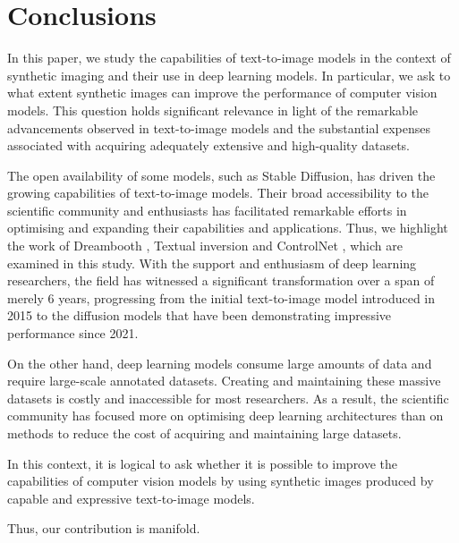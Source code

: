 \chapter{Conclusions} \label{sec:conclusions}

In this paper, we study the capabilities of text-to-image models in the context of synthetic imaging and their use in deep learning models. In particular, we ask to what extent synthetic images can improve the performance of computer vision models. This question holds significant relevance in light of the remarkable advancements observed in text-to-image models and the substantial expenses associated with acquiring adequately extensive and high-quality datasets.

The open availability of some models, such as Stable Diffusion, has driven the growing capabilities of text-to-image models. Their broad accessibility to the scientific community and enthusiasts has facilitated remarkable efforts in optimising and expanding their capabilities and applications. Thus, we highlight the work of Dreambooth \cite{ruiz2023dreambooth}, Textual inversion \cite{gal2022image} and ControlNet \cite{zhang2023adding}, which are examined in this study. With the support and enthusiasm of deep learning researchers, the field has witnessed a significant transformation over a span of merely 6 years, progressing from the initial text-to-image model \cite{mansimov2015generating} introduced in 2015 to the diffusion models \cite{saharia2022palette, nichol2021glide} that have been demonstrating impressive performance since 2021.

On the other hand, deep learning models consume large amounts of data and require large-scale annotated datasets. Creating and maintaining these massive datasets is costly and inaccessible for most researchers. As a result, the scientific community has focused more on optimising deep learning architectures than on methods to reduce the cost of acquiring and maintaining large datasets.

In this context, it is logical to ask whether it is possible to improve the capabilities of computer vision models by using synthetic images produced by capable and expressive text-to-image models.

Thus, our contribution is manifold.


